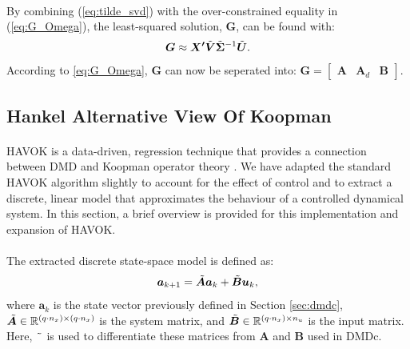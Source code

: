         \paragraph{}
        By combining (\ref{eq:tilde_svd}) with the over-constrained equality in (\ref{eq:G_Omega}), 
        the least-squared solution, $\bm{G}$, can be found with:
        \begin{equation}
            \bm{G} \approx \bm{X^\prime} \Tilde{\bm{V}} \Tilde{\bm{\Sigma}}^{-1} \Tilde{\bm{U}} .
        \end{equation}
        According to \ref{eq:G_Omega}, $\bm{G}$ can now be seperated into:
        \(
            \bm{G} = \begin{bmatrix} \bm{A} & \bm{A}_d & \bm{B} \end{bmatrix}.
        \)
        
        \subsection{Hankel Alternative View Of Koopman}
% 
    \paragraph{}
    HAVOK is a data-driven, regression technique that provides a connection between DMD and Koopman operator theory \cite{Brunton2017, Champion2019}. 
    We have adapted the standard HAVOK algorithm slightly to account for the effect of control and to extract a discrete, linear model that approximates the behaviour of a controlled dynamical system.
    In this section, a brief overview is provided for this implementation and expansion of \mbox{HAVOK}.
    \paragraph{}
    The extracted discrete state-space model is defined as:
    \begin{equation} \label{eq:havoc_state_space}
        \bm{a}_{k+1} = \Tilde{\bm{A}} \bm{a}_k + \Tilde{\bm{B}} \bm{u}_k ,
    \end{equation}
    where $\bm{a}_k$ is the state vector previously defined in Section \ref{sec:dmdc}, 
    \( \Tilde{\bm{A}} \in \mathbb{R}^{(q \cdot n_x) \times (q \cdot n_x)} \) is the system matrix, 
    and \( \Tilde{\bm{B}} \in \mathbb{R}^{(q \cdot n_x) \times n_u} \) is the input matrix. 
    Here, $\Tilde{\phantom{a}}$ is used to differentiate these matrices from $\bm{A}$ and $\bm{B}$ used in DMDc.
